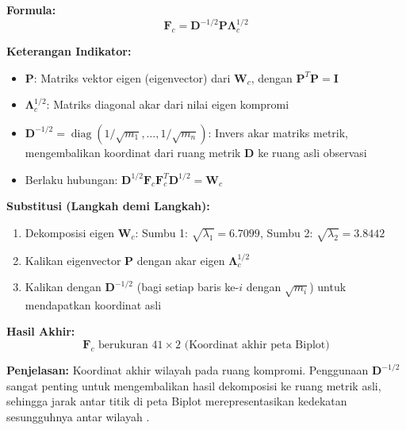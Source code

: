 \documentclass[11pt,a4paper]{article}
\begin{document}
\begin{tcolorbox}[formula_box, title={17. Koordinat Skor Kompromi ($\mathbf{F}_c$)}]
\textbf{Formula:}
\[ \mathbf{F}_c = \mathbf{D}^{-1/2} \mathbf{P} \mathbf{\Lambda}_c^{1/2} \]

\textbf{Keterangan Indikator:}
\begin{itemize}
  \item $\mathbf{P}$: Matriks vektor eigen (eigenvector) dari $\mathbf{W}_c$, dengan $\mathbf{P}^T\mathbf{P} = \mathbf{I}$
  \item $\mathbf{\Lambda}_c^{1/2}$: Matriks diagonal akar dari nilai eigen kompromi
  \item $\mathbf{D}^{-1/2} = \operatorname{diag}(1/\sqrt{m_1}, \ldots, 1/\sqrt{m_n})$: Invers akar matriks metrik, mengembalikan koordinat dari ruang metrik $\mathbf{D}$ ke ruang asli observasi \citet{lavit94}
  \item Berlaku hubungan: $\mathbf{D}^{1/2}\mathbf{F}_c\mathbf{F}_c^T\mathbf{D}^{1/2} = \mathbf{W}_c$
\end{itemize}

\textbf{Substitusi (Langkah demi Langkah):}
\begin{enumerate}
  \item Dekomposisi eigen $\mathbf{W}_c$: Sumbu 1: $\sqrt{\lambda_1} = 6.7099$, Sumbu 2: $\sqrt{\lambda_2} = 3.8442$
  \item Kalikan eigenvector $\mathbf{P}$ dengan akar eigen $\mathbf{\Lambda}_c^{1/2}$
  \item Kalikan dengan $\mathbf{D}^{-1/2}$ (bagi setiap baris ke-$i$ dengan $\sqrt{m_i}$) untuk mendapatkan koordinat asli
\end{enumerate}

\textbf{Hasil Akhir:}
\[ \mathbf{F}_c \text{ berukuran } 41\times2 \text{ (Koordinat akhir peta Biplot)} \]

\textbf{Penjelasan:} Koordinat akhir wilayah pada ruang kompromi. Penggunaan $\mathbf{D}^{-1/2}$ sangat penting untuk mengembalikan hasil dekomposisi ke ruang metrik asli, sehingga jarak antar titik di peta Biplot merepresentasikan kedekatan sesungguhnya antar wilayah \citet{lavit94}.
\end{tcolorbox}
\end{document}

